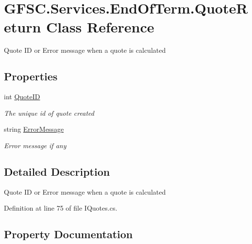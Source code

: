 \hypertarget{class_g_f_s_c_1_1_services_1_1_end_of_term_1_1_quote_return}{}\section{G\+F\+S\+C.\+Services.\+End\+Of\+Term.\+Quote\+Return Class Reference}
\label{class_g_f_s_c_1_1_services_1_1_end_of_term_1_1_quote_return}


Quote ID or Error message when a quote is calculated  


\subsection*{Properties}
\begin{DoxyCompactItemize}
\item 
int \mbox{\hyperlink{class_g_f_s_c_1_1_services_1_1_end_of_term_1_1_quote_return_a5cefff1bdb7ebaa2e4afeff992dc489c}{Quote\+ID}}
\begin{DoxyCompactList}\small\item\em The unique id of quote created \end{DoxyCompactList}\item 
string \mbox{\hyperlink{class_g_f_s_c_1_1_services_1_1_end_of_term_1_1_quote_return_aca2140fd0599932c9347a0e2019e37a7}{Error\+Message}}
\begin{DoxyCompactList}\small\item\em Error message if any \end{DoxyCompactList}\end{DoxyCompactItemize}


\subsection{Detailed Description}
Quote ID or Error message when a quote is calculated 



Definition at line 75 of file I\+Quotes.\+cs.



\subsection{Property Documentation}
\mbox{\label{class_g_f_s_c_1_1_services_1_1_end_of_term_1_1_quote_return_aca2140fd0599932c9347a0e2019e37a7}} 
